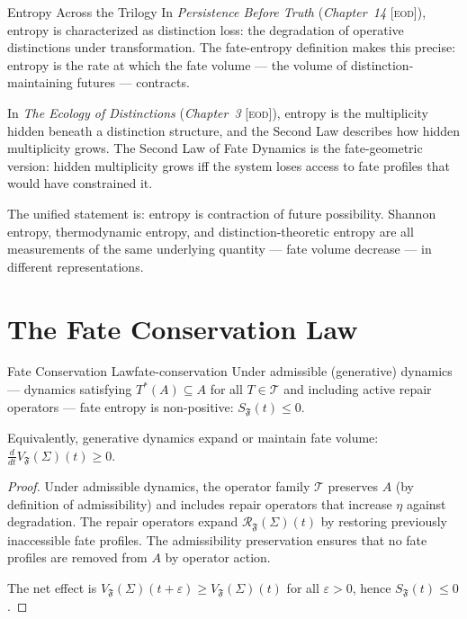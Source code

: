 \documentclass[12pt,twoside,openright]{book}
\newcommand{\transfam}{\mathcal{T}}       %
\newcommand{\fateMap}{\mathfrak{F}}
\newcommand{\repEff}{\eta}               %
\newcommand{\EOD}[1]{\textit{#1} [\textsc{eod}]}
\newcommand{\admRegion}{A}
\providecommand{\admRegion}{A}
\providecommand{\fateReach}[1]{\mathcal{R}_{\fateMap}(#1)}
\providecommand{\fateVol}[1]{V_{\fateMap}(#1)}
\providecommand{\fateEnt}{S_{\fateMap}}
\begin{document}
\begin{trilogylink}{Entropy Across the Trilogy}
In \textit{Persistence Before Truth} (\EOD{Chapter~14}),
entropy is characterized as distinction loss: the degradation
of operative distinctions under transformation. The fate-entropy
definition makes this precise: entropy is the rate at which
the fate volume --- the volume of distinction-maintaining
futures --- contracts.

In \textit{The Ecology of Distinctions} (\EOD{Chapter~3}),
entropy is the multiplicity hidden beneath a distinction
structure, and the Second Law describes how hidden multiplicity
grows. The Second Law of Fate Dynamics is the fate-geometric
version: hidden multiplicity grows iff the system loses access
to fate profiles that would have constrained it.

The unified statement is: entropy is contraction of future
possibility. Shannon entropy, thermodynamic entropy, and
distinction-theoretic entropy are all measurements of the same
underlying quantity --- fate volume decrease --- in different
representations.
\end{trilogylink}

\section{The Fate Conservation Law}

\begin{theorem}{Fate Conservation Law}{fate-conservation}
Under admissible (generative) dynamics --- dynamics satisfying
$T^*(\admRegion)\subseteq\admRegion$ for all $T\in\transfam$
and including active repair operators --- fate entropy is
non-positive: $\fateEnt(t)\le 0$.

Equivalently, generative dynamics expand or maintain fate
volume: $\frac{d}{dt}\fateVol{\Sigma}(t)\ge 0$.
\begin{proof}
Under admissible dynamics, the operator family $\transfam$
preserves $\admRegion$ (by definition of admissibility) and
includes repair operators that increase $\repEff$ against
degradation. The repair operators expand $\fateReach{\Sigma}(t)$
by restoring previously inaccessible fate profiles. The
admissibility preservation ensures that no fate profiles are
removed from $\admRegion$ by operator action.

The net effect is $\fateVol{\Sigma}(t+\varepsilon)\ge
\fateVol{\Sigma}(t)$ for all $\varepsilon>0$, hence
$\fateEnt(t)\le 0$.
\end{proof}
\end{theorem}
\end{document}
